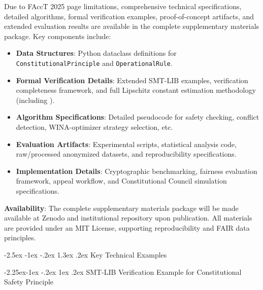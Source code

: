\documentclass[manuscript,screen,9pt]{acmart}
\makeatletter
\renewcommand\section{\@startsection{section}{1}{\z@}%
  {-2.5ex \@plus -1ex \@minus -.2ex}%
  {1.3ex \@plus.2ex}%
  {\normalfont\Large\bfseries}}
\renewcommand\subsection{\@startsection{subsection}{2}{\z@}%
  {-2.25ex\@plus -1ex \@minus -.2ex}%
  {1ex \@plus .2ex}%
  {\normalfont\large\bfseries}}
\makeatother
\begin{document}
Due to FAccT 2025 page limitations, comprehensive technical specifications, detailed algorithms, formal verification examples, proof-of-concept artifacts, and extended evaluation results are available in the complete supplementary materials package. Key components include:
\begin{itemize}[leftmargin=*,itemsep=1pt,parsep=1pt]
    \item \textbf{Data Structures}: Python dataclass definitions for \texttt{ConstitutionalPrinciple} and \texttt{OperationalRule}.
    \item \textbf{Formal Verification Details}: Extended SMT-LIB examples, verification completeness framework, and full Lipschitz constant estimation methodology (including ).
    \item \textbf{Algorithm Specifications}: Detailed pseudocode for safety checking, conflict detection, WINA-optimizer strategy selection, etc.
    \item \textbf{Evaluation Artifacts}: Experimental scripts, statistical analysis code, raw/processed anonymized datasets, and reproducibility specifications.
    \item \textbf{Implementation Details}: Cryptographic benchmarking, fairness evaluation framework, appeal workflow, and Constitutional Council simulation specifications.
\end{itemize}
\textbf{Availability}: The complete supplementary materials package will be made available at Zenodo and institutional repository upon publication. All materials are provided under an MIT License, supporting reproducibility and FAIR data principles.

\section{Key Technical Examples}
\label{app:key_examples}

\subsection{SMT-LIB Verification Example for Constitutional Safety Principle}
\label{subsubsec:smtlib_verification_example}
\end{document}
